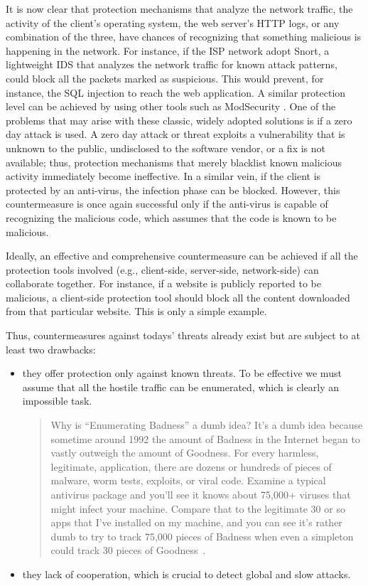 It is now clear that protection mechanisms that analyze the network traffic, the activity of the client's operating system, the web server's \ac{HTTP} logs, or any combination of the three, have chances of recognizing that something malicious is happening in the network. For instance, if the \ac{ISP} network adopt \textsf{Snort}, a lightweight \ac{IDS} that analyzes the network traffic for known attack patterns, could block all the packets marked as suspicious. This would prevent, for instance, the \ac{SQL} injection to reach the web application. A similar protection level can be achieved by using other tools such as \textsf{ModSecurity} \citep{ristic:mod_security}. One of the problems that may arise with these classic, widely adopted solutions is if a zero day attack is used. A zero day attack or threat exploits a vulnerability that is unknown to the public, undisclosed to the software vendor, or a fix is not available; thus, protection mechanisms that merely blacklist known malicious activity immediately become ineffective. In a similar vein, if the client is protected by an anti-virus, the infection phase can be blocked. However, this countermeasure is once again successful only if the anti-virus is capable of recognizing the malicious code, which assumes that the code is known to be malicious.

Ideally, an effective and comprehensive countermeasure can be achieved if all the protection tools involved (e.g., client-side, server-side, network-side) can collaborate together. For instance, if a website is publicly reported to be malicious, a client-side protection tool should block all the content downloaded from that particular website. This is only a simple example.

Thus, countermeasures against todays' threats already exist but are subject to at least two drawbacks:

\begin{itemize}
\item they offer protection only against known threats. To be effective we must assume that all the hostile traffic can be enumerated, which is clearly an impossible task.

\begin{quotation}
Why is ``Enumerating Badness'' a dumb idea? It's a dumb idea because sometime around 1992 the amount of Badness in the Internet began to vastly outweigh the amount of Goodness. For every harmless, legitimate, application, there are dozens or hundreds of pieces of malware, worm tests, exploits, or viral code. Examine a typical antivirus package and you'll see it knows about 75,000+ viruses that might infect your machine. Compare that to the legitimate 30 or so apps that I've installed on my machine, and you can see it's rather dumb to try to track 75,000 pieces of Badness when even a simpleton could track 30 pieces of Goodness~\citep{ranum-myths}.
\end{quotation}

\item they lack of cooperation, which is crucial to detect global and slow attacks.
\end{itemize}

